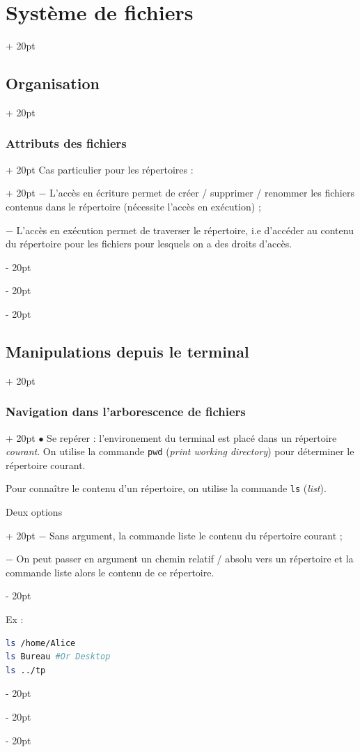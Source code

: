 \documentclass[a4paper, 12pt, twoside]{article}
\renewcommand{\em}{\color{ff4500}}
\newcommand{\ind}[1][20pt]{\advance\leftskip + #1}
\newcommand{\deind}[1][20pt]{\advance\leftskip - #1}
\newenvironment{indentedenv}[1][20pt]{\par \ind[#1]}{\par \deind}
\newenvironment{indt}[2][20pt]{#2 \begin{indentedenv}[#1]}{\end{indentedenv}} %
\begin{document}
\begin{indt}{\section{Système de fichiers}}
\begin{indt}{\subsection{Organisation}}
\begin{indt}{\subsubsection{Attributs des fichiers}}
\begin{indt}{Cas particulier pour les répertoires :}
                    $-$ L'accès en écriture permet de créer / supprimer / renommer les fichiers contenus dans le répertoire (nécessite l'accès en exécution) ;
                    
                    $-$ L'accès en exécution permet de traverser le répertoire, i.e d'accéder au contenu du répertoire pour les fichiers pour lesquels on a des droits d'accès.
                \end{indt}
            \end{indt}
        \end{indt}
        
        \vspace{12pt}
        
        \begin{indt}{\subsection{Manipulations depuis le terminal}}
            \begin{indt}{\subsubsection{Navigation dans l'arborescence de fichiers}}
                $\bullet$ Se repérer : l'environement du terminal est placé dans un répertoire \textit{courant}. On utilise la commande \texttt{\em pwd} (\textit{print working directory}) pour déterminer le répertoire courant.
                
                Pour connaître le contenu d'un répertoire, on utilise la commande \texttt{\em ls} (\textit{list}).
                
                \begin{indt}{Deux options}
                    $-$ Sans argument, la commande liste le contenu du répertoire courant ;
                    
                    $-$ On peut passer en argument un chemin relatif / absolu vers un répertoire et la commande liste alors le contenu de ce répertoire.
                \end{indt}
                
                Ex :
                \begin{lstlisting}[language=Bash, xleftmargin=80pt]
ls /home/Alice
ls Bureau #Or Desktop
ls ../tp\end{lstlisting}
                
                \vspace{12pt}
                

\end{indt}
\end{indt}
\end{indt}
\end{document}
